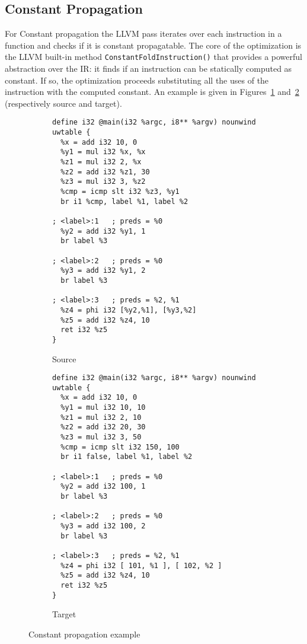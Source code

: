 \subsection{Constant Propagation}
\label{sub:constant_propagation}

For Constant propagation the LLVM pass iterates over each instruction in a function and checks if it is constant propagatable. The core of the optimization is the LLVM built-in method \texttt{ConstantFoldInstruction()} that provides a powerful abstraction over the IR: it finds if an instruction can be statically computed as constant. If so, the optimization proceeds substituting all the uses of the instruction with the computed constant. An example is given in Figures~\ref{fig:sconstprop} and~\ref{fig:tconstprop} (respectively source and target).

\begin{figure}[t]
  \begin{mdframed}
  \centering
  \begin{subfigure}[b]{0.49\textwidth}
    \centering
    \begin{lstlisting}
define i32 @main(i32 %argc, i8** %argv) nounwind uwtable {
  %x = add i32 10, 0
  %y1 = mul i32 %x, %x
  %z1 = mul i32 2, %x
  %z2 = add i32 %z1, 30
  %z3 = mul i32 3, %z2
  %cmp = icmp slt i32 %z3, %y1
  br i1 %cmp, label %1, label %2

; <label>:1   ; preds = %0
  %y2 = add i32 %y1, 1
  br label %3

; <label>:2   ; preds = %0
  %y3 = add i32 %y1, 2
  br label %3

; <label>:3   ; preds = %2, %1
  %z4 = phi i32 [%y2,%1], [%y3,%2]
  %z5 = add i32 %z4, 10
  ret i32 %z5
}
    \end{lstlisting}
    \caption{Source}
    \label{fig:sconstprop}
  \end{subfigure}
  \begin{subfigure}[b]{0.49\textwidth}
    \centering
    \begin{lstlisting}
define i32 @main(i32 %argc, i8** %argv) nounwind uwtable {
  %x = add i32 10, 0
  %y1 = mul i32 10, 10
  %z1 = mul i32 2, 10
  %z2 = add i32 20, 30
  %z3 = mul i32 3, 50
  %cmp = icmp slt i32 150, 100
  br i1 false, label %1, label %2

; <label>:1   ; preds = %0
  %y2 = add i32 100, 1
  br label %3

; <label>:2   ; preds = %0
  %y3 = add i32 100, 2
  br label %3

; <label>:3   ; preds = %2, %1
  %z4 = phi i32 [ 101, %1 ], [ 102, %2 ]
  %z5 = add i32 %z4, 10
  ret i32 %z5
}
    \end{lstlisting}
    \caption{Target}
    \label{fig:tconstprop}
  \end{subfigure}
  \end{mdframed}
  \caption{Constant propagation example}
  \label{fig:constprop}
\end{figure}

